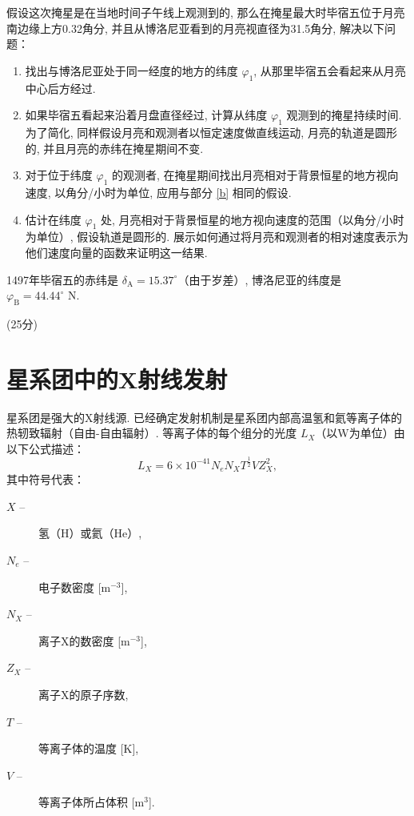 \documentclass[a4paper,fontset=fandol]{ctexart}
\newcommand{\points}[1]{\par %
	\noindent %
	\hfill (#1分)%
	\vspace{1em}
	}
\begin{document}
	假设这次掩星是在当地时间子午线上观测到的, 那么在掩星最大时毕宿五位于月亮南边缘上方0.32角分, 并且从博洛尼亚看到的月亮视直径为31.5角分, 解决以下问题：
	
	\begin{enumerate}[label=(\alph*)]
		\item 找出与博洛尼亚处于同一经度的地方的纬度 $\varphi_1$, 从那里毕宿五会看起来从月亮中心后方经过. 
		
		\item 如果毕宿五看起来沿着月盘直径经过, 计算从纬度 $\varphi_1$ 观测到的掩星持续时间. 为了简化, 同样假设月亮和观测者以恒定速度做直线运动, 月亮的轨道是圆形的, 并且月亮的赤纬在掩星期间不变. \label{b}
		
		\item 对于位于纬度 $\varphi_1$ 的观测者, 在掩星期间找出月亮相对于背景恒星的地方视向速度, 以角分/小时为单位, 应用与部分 \ref{b} 相同的假设. 
		
		\item 估计在纬度 $\varphi_1$ 处, 月亮相对于背景恒星的地方视向速度的范围（以角分/小时为单位）, 假设轨道是圆形的. 展示如何通过将月亮和观测者的相对速度表示为他们速度向量的函数来证明这一结果. 
	\end{enumerate}
	
	1497年毕宿五的赤纬是 $\delta_\mathrm{A} = 15.37^\circ$（由于岁差）, 博洛尼亚的纬度是 $\varphi_\mathrm{B} = 44.44^\circ\text{ N}$. 
	
	\points{25}
	
	\section{星系团中的X射线发射}
	
	星系团是强大的X射线源. 已经确定发射机制是星系团内部高温氢和氦等离子体的热轫致辐射（自由-自由辐射）. 等离子体的每个组分的光度 \( L_X \)（以W为单位）由以下公式描述：
	\[ L_X = 6 \times 10^{-41} N_e N_X T^{\frac{1}{2}} V Z_X^2, \]
	其中符号代表：
	\begin{description}
		\item[$X$ --] 氢（H）或氦（He）,
		\item[$N_e$ --] 电子数密度 [\( \text{m}^{-3} \)], 
		\item[$N_X$ --] 离子X的数密度 [\( \text{m}^{-3} \)], 
		\item[$Z_X$ --] 离子X的原子序数, 
		\item[$T$ --] 等离子体的温度 [K], 
		\item[$V$ --] 等离子体所占体积 [\( \text{m}^3 \)]. 
	\end{description}
	
\end{document}
